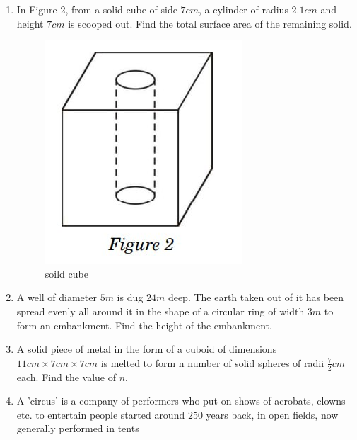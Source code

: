 \begin{enumerate}
\item  In Figure 2, from a solid cube of side $7 cm$, a cylinder of radius $2.1 cm$ and height $7 cm$ is scooped out. Find the total surface area of the remaining solid.
\begin{figure}[H]
\centering
\includegraphics[width=\columnwidth]{figs/solid cube.png}
\caption{soild cube}
\label{fig:solid cube}
\end{figure}

\item  A well of diameter $5 m$ is dug $24 m$ deep. The earth taken out of it has been spread evenly all around it in the shape of a circular ring of width $3 m$ to form an embankment. Find the height of the embankment.

 \item  A solid piece of metal in the form of a cuboid of dimensions $11 cm\times 7 cm\times 7 cm$ is melted to form n number of solid spheres of radii $\frac{7}{2}cm$ each. Find the value of $n$.
\newpage     
\item  A 'circus' is a company of performers who put on shows of acrobats, clowns etc. to entertain people started around $250$ years back, in open fields, now generally performed in tents


\end{enumerate}
